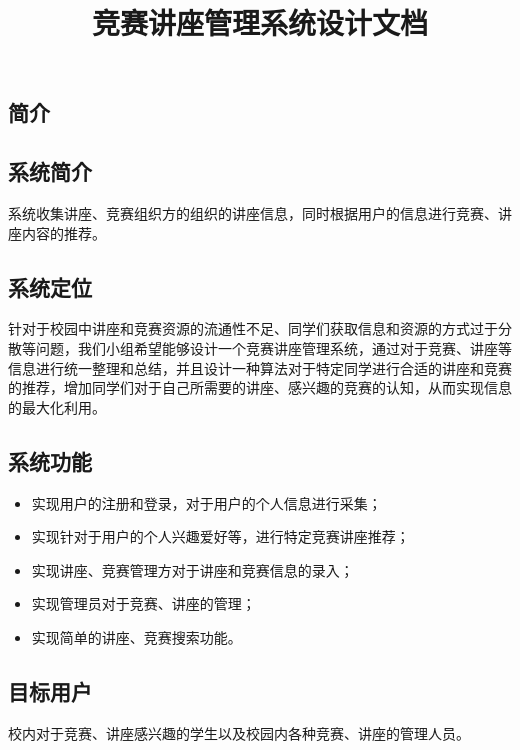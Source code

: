 \documentclass[UTF8]{ctexart}
\date{}
\title{\textbf{竞赛讲座管理系统设计文档}}
\author{\rightline{SigmaGo小组}}
\begin{document}
\begin{spacing}{1.3}
\maketitle


\section{简介}
\subsection{系统简介}
系统收集讲座、竞赛组织方的组织的讲座信息，同时根据用户的信息进行竞赛、讲座内容的推荐。

\subsection{系统定位}
针对于校园中讲座和竞赛资源的流通性不足、同学们获取信息和资源的方式过于分散等问题，我们小组希望能够设计一个竞赛讲座管理系统，通过对于竞赛、讲座等信息进行统一整理和总结，并且设计一种算法对于特定同学进行合适的讲座和竞赛的推荐，增加同学们对于自己所需要的讲座、感兴趣的竞赛的认知，从而实现信息的最大化利用。



\subsection{系统功能}
\begin{itemize}
    \item 实现用户的注册和登录，对于用户的个人信息进行采集；
    
    \item 实现针对于用户的个人兴趣爱好等，进行特定竞赛讲座推荐；
    
    \item 实现讲座、竞赛管理方对于讲座和竞赛信息的录入；
    
    \item 实现管理员对于竞赛、讲座的管理；
    
    \item 实现简单的讲座、竞赛搜索功能。
\end{itemize}


\subsection{目标用户}
校内对于竞赛、讲座感兴趣的学生以及校园内各种竞赛、讲座的管理人员。


\end{spacing}
\end{document}
